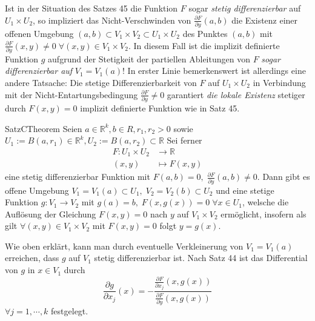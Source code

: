 Ist in der Situation des Satzes 45 die Funktion $ F $ sogar \textit{stetig differenzierbar} auf $ U_1 \times U_2 $, so impliziert das 
Nicht-Verschwinden von $ \frac{\partial F}{\partial y} (a,b) $ die Existenz einer offenen Umgebung $ (a,b) \subset   V_1 \times V_2
\subset  U_1 \times U_2$ des Punktes $ (a,b) $ mit $ \frac{\partial F}{\partial y} (x,y) \neq 0 \; \forall  (x,y) \in  V_1 \times V_2	$.
In diesem Fall ist die implizit definierte Funktion $ g $ aufgrund der Stetigkeit der partiellen Ableitungen von $ F $ \textit{sogar 
differenzierbar auf }$ V_1 = V_1 (a)  $! In erster Linie bemerkenswert ist allerdings eine andere Tatsache: Die stetige
Differenzierbarkeit von $ F $ auf $ U_1 \times U_2 $ in Verbindung mit der Nicht-Entartungsbedingung $ \frac{\partial F}{\partial y} 
\neq 0$ garantiert \textit{die lokale Existenz} stetiger durch $ F \left( x,y \right) = 0 $ implizit definierte Funktion wie in 
Satz 45.

\begin{ibox}[46]{Satz}{CTheorem}
    Seien $ a \in \mathbb{R}^{k}, b \in R, r_1, r_2 > 0	$ sowie $ U_1 := B (a,r_1) \in \mathbb{R}^k, U_2 := B (a,r_2) \subset \mathbb{R} 
		$ Sei ferner
		\begin{align*}
			F: U_1 \times U_2 & \to \mathbb{R} \\
			(x,y) & \mapsto F(x,y)
		\end{align*}
	eine stetig differenzierbar Funktion mit $ F (a,b)  = 0, \; \frac{\partial F}{\partial y} (a,b) \neq 0 $. Dann gibt es offene 
	Umgebung $ V_1 = V_1 (a)  \subset U_1, \; V_2 = V_2 (b)  \subset U_2 $ und eine stetige Funktion $ g: V_1 \to V_2 $ mit 
	$ g (a) = b, \; F \left( x, g(x) \right) = 0 \; \forall  x \in U_1 $, welsche die Auflösung der Gleichung $ F (x,y) = 0 $ nach $ y $ 
	auf $ V_1 \times V_2 $ ermöglicht, insofern als gilt $ \forall (x,y) \in  V_1 \times V_2 $ mit $ F (x,y) = 0 $ folgt $ y = g (x)  $.
\end{ibox}
Wie oben erklärt, kann man durch eventuelle Verkleinerung von $ V_1 = V_1 (a)  $ erreichen, dass $ g $ auf $ V_1 $ stetig
differenzierbar ist. Nach Satz 44 ist das Differential von $ g $ in $ x \in V_1 $ durch 
$$ \frac{\partial g}{\partial x_j} (x) = - \frac{ \frac{\partial F}{\partial x_j}( x, g (x))  }{ \frac{\partial F}{\partial y} 
(x, g(x))} $$
$ \forall j = 1, \cdots,  k  $ festgelegt.


